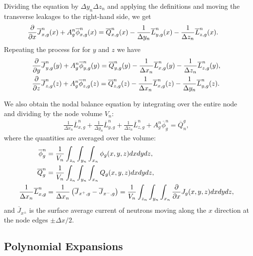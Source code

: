 Dividing the equation by $\Delta y_n \Delta z_n$ and applying the definitions and moving the transverse leakages to the right-hand side, we get
\begin{align}
    &\frac{ \partial {} }{ \partial {x} } \overline{J}_{x,g}^n(x) + A_g^n \overline{\phi}_{x,g}^n(x) 
  = \overline{Q}_{x,g}^n(x) - \frac{1}{\Delta y_n} \overline{L}_{y,g}^n(x) - \frac{1}{\Delta z_n} \overline{L}_{z,g}^n(x) . \label{Eq:diffusion_nodalDiffusionEquation_x}
\end{align}
Repeating the process for for $y$ and $z$ we have
\begin{align}
    &\frac{ \partial {} }{ \partial {y} } \overline{J}_{y,g}^n(y) + A_g^n \overline{\phi}_{y,g}^n(y) 
  = \overline{Q}_{y,g}^n(y) - \frac{1}{\Delta x_n} \overline{L}_{x,g}^n(y) - \frac{1}{\Delta z_n} \overline{L}_{z,g}^n(y) ,  \\
    &\frac{ \partial {} }{ \partial {z} } \overline{J}_{z,g}^n(z) + A_g^n \overline{\phi}_{z,g}^n(z) 
  = \overline{Q}_{z,g}^n(z) - \frac{1}{\Delta x_n} \overline{L}_{x,g}^n(z) - \frac{1}{\Delta y_n} \overline{L}_{y,g}^n(z) .  
\end{align}

We also obtain the nodal balance equation by integrating over the entire node and dividing by the node volume $V_n$:
\begin{align}
  \frac{1}{\Delta x_n} \overline{L}_{x,g}^n + \frac{1}{\Delta y_n} \overline{L}_{y,g}^n + \frac{1}{\Delta z_n} \overline{L}_{z,g}^n + A_g^n \overline{\phi}_g^n = \overline{Q}_n^g ,
\end{align}
where the quantities are averaged over the volume:
\begin{subequations}
\begin{align}
  \overline{\phi}_g^n &= \frac{1}{V_n} \int_{z_n} \int_{y_n} \int_{x_n} \phi_g(x,y,z) dx dy dz, \\
  \overline{Q}_g^n    &= \frac{1}{V_n} \int_{z_n} \int_{y_n} \int_{x_n} Q_g(x,y,z) dx dy dz, \\
  \frac{1}{\Delta x_n} \overline{L}_{x,g}^n  &=   \frac{1}{\Delta x_n} \left( \overline{J}_{x^+,g} - \overline{J}_{x^-,g} \right) 
  = \frac{1}{V_n} \int_{z_n} \int_{y_n} \int_{x_n} \frac{ \partial {} }{ \partial {x} } J_g(x,y,z) dx dy dz, 
\end{align}
\end{subequations}
and $\overline{J}_{x^\pm}$ is the surface average current of neutrons moving along the $x$ direction at the node edges $\pm \Delta x / 2$.




\subsection{Polynomial Expansions}

